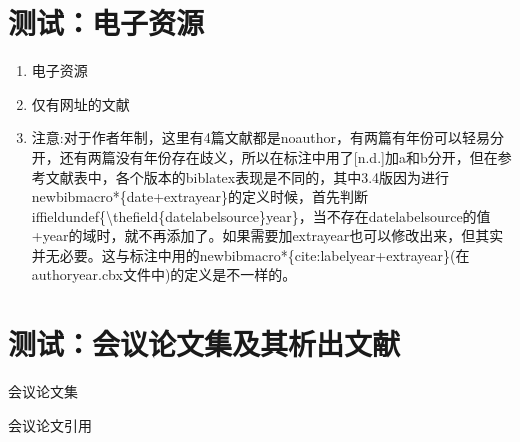 \section{测试：电子资源}
\begin{refsection}
\begin{enumerate}
  \item 电子资源\cite{Commonwealth--,HOPKINSON--,OMG2003--,OCLC--,李强2012-05-03--,萧钰2001--,Alliance--,Dublin2012-06-14--,JabRef中文手册--,1989--,JabRefManual--}

  \item 仅有网址的文献
\cite{1962-50-50,2009-155-155}
\cite{olnoauthorcn}
\cite{olnoauthoren}
\cite{Allianceurlonly}

\item 注意:对于作者年制，这里有4篇文献都是noauthor，有两篇有年份可以轻易分开，还有两篇没有年份存在歧义，所以在标注中用了[n.d.]加a和b分开，但在参考文献表中，各个版本的biblatex表现是不同的，其中3.4版因为进行newbibmacro*\{date+extrayear\}的定义时候，首先判断iffieldundef\{\textbackslash thefield\{datelabelsource\}year\}，当不存在datelabelsource的值+year的域时，就不再添加了。如果需要加extrayear也可以修改出来，但其实并无必要。这与标注中用的newbibmacro*\{cite:labelyear+extrayear\}(在authoryear.cbx文件中)的定义是不一样的。

\end{enumerate}

{
\printbibliography%
}
\end{refsection}

\section{测试：会议论文集及其析出文献}
\begin{refsection}
会议论文集\cite{陈志勇2011--,雷光春2012--,ROSENTHALL1963--,GANZHA2000--,Babu2014--,中国力学学会1999--, 中国社会科学院台湾史研究中心2012--}

会议论文引用\cite{韩吉人1985-90-99,FOURNEY1971-17-38,FOURNEY1971-17-38a,Nemec1997-209-214, 贾东琴2011-45-52, 裴丽生1981-2-10,汪学军2002-22-25,张忠智1997-33-34}
      \cite{Choi2002-1075-1080,Dardari2002-201-206,Firoozbakhsh2003-473-477,Foerster2002-1931-1935,
      Fontana2002-309-313,Giorgetti2005-794-798,Giorgetti2006--,Li2004-21-24,Nasri2008-3616-3621,Piazzo2001--}

{
\printbibliography%
}
\end{refsection}

